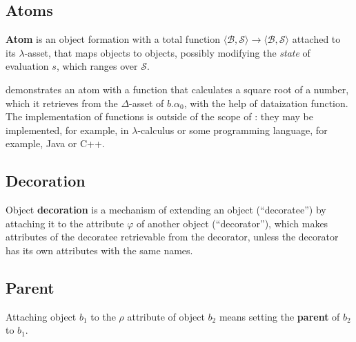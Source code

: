 \subsection{Atoms}

\begin{definition}[Atom]
\textbf{Atom} is an object formation with a total function \(\langle \mathcal{B}, \mathcal{S} \rangle \to \langle \mathcal{B}, \mathcal{S} \rangle\) attached to its \(\lambda\)-asset, that maps objects to objects, possibly modifying the \emph{state} of evaluation \(s\), which ranges over \(\mathcal{S}\).
\end{definition}

 demonstrates an atom with a function that calculates a square root of a number, which it retrieves from the \(\Delta\)-asset of \(b.\alpha_0\), with the help of dataization function. The implementation of functions is outside of the scope of \phic{}: they may be implemented, for example, in \(\lambda\)-calculus or some programming language, for example, Java or C++.

\subsection{Decoration}

\begin{definition}[Decoration]
Object \textbf{decoration} is a mechanism of extending an object (``decoratee'') by attaching it to the attribute \(\varphi\) of another object (``decorator''), which makes attributes of the decoratee retrievable from the decorator, unless the decorator has its own attributes with the same names.
\end{definition}

\subsection{Parent}

\begin{definition}[Parent]
Attaching object \(b_1\) to the \(\rho\) attribute of object \(b_2\) means setting the \textbf{parent} of \(b_2\) to \(b_1\).
\end{definition}
